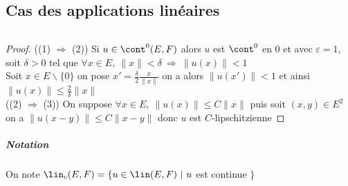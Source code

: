 	\subsection{Cas des applications linéaires}
		${}$ \\ 
		\begin{proof}
		({\tiny (1)} $\Rightarrow$ {\tiny (2)}) Si $u\in \cont^0 (E,F)$ alors $u$ est $\cont^0$ en $0$ et avec $\varepsilon = 1$, soit $\delta >0$
		tel que $\forall x\in E , ~\| x \| < \delta ~\Rightarrow ~\| u(x) \| < 1$ \\
		Soit $x\in E\backslash \{0\}$ on pose $x' = \frac{\delta}{2}\frac{x}{\| x \|}$ on a alors $\| u(x' ) \| <1$ et ainsi 
		$\| u(x) \| \leq \frac{2}{\delta} \| x \|$ \\ 
		\hspace*{2.6cm}({\tiny (2)} $\Rightarrow$ {\tiny (3)}) On suppose $\forall x\in E , ~\| u(x) \| \leq C\| x \| $ puis soit $(x,y) \in E^2$ 
		\\ on a $\| u(x-y) \| \leq C \| x-y \|$ donc $u$ est $C$-lipschitzienne
		\end{proof}
		\subparagraph{Notation}
			On note $\lin_c (E,F) = \{u\in \lin (E,F) ~|~u$ est continue $\}$ \newpage \traitd 
